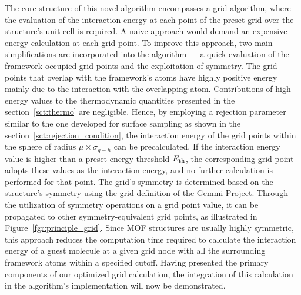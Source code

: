 \documentclass[main]{subfiles}
\begin{document}
The core structure of this novel algorithm encompasses a grid algorithm, where the evaluation of the interaction energy at each point of the preset grid over the structure's unit cell is required. A naive approach would demand an expensive energy calculation at each grid point. To improve this approach, two main simplifications are incorporated into the algorithm --- a quick evaluation of the framework occupied grid points and the exploitation of symmetry. The grid points that overlap with the framework's atoms have highly positive energy mainly due to the interaction with the overlapping atom. Contributions of high-energy values to the thermodynamic quantities presented in the section~\ref{sct:thermo} are negligible. Hence, by employing a rejection parameter similar to the one developed for surface sampling as shown in the section~\ref{sct:rejection_condition}, the interaction energy of the grid points within the sphere of radius $\mu\times\sigma_{g-h}$ can be precalculated. If the interaction energy value is higher than a preset energy threshold $E_{\text{th}}$, the corresponding grid point adopts these values as the interaction energy, and no further calculation is performed for that point. The grid's symmetry is determined based on the structure's symmetry using the grid definition of the Gemmi Project. Through the utilization of symmetry operations on a grid point value, it can be propagated to other symmetry-equivalent grid points, as illustrated in Figure~\ref{fgr:principle_grid}. Since MOF structures are usually highly symmetric, this approach reduces the computation time required to calculate the interaction energy of a guest molecule at a given grid node with all the surrounding framework atoms within a specified cutoff. Having presented the primary components of our optimized grid calculation, the integration of this calculation in the algorithm's implementation will now be demonstrated.
\end{document}
